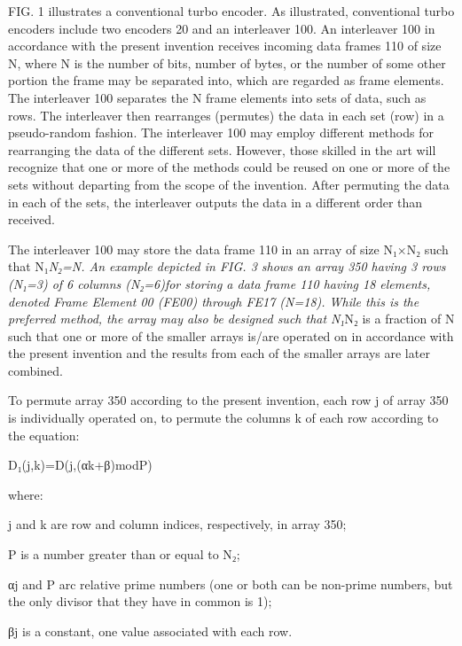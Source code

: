 \documentclass[11pt,a4paper]{article}
\begin{document}
FIG. 1 illustrates a conventional turbo encoder. As illustrated, conventional turbo encoders include two encoders 20 and an interleaver 100. An interleaver 100 in accordance with the present invention receives incoming data frames 110 of size N, where N is the number of bits, number of bytes, or the number of some other portion the frame may be separated into, which are regarded as frame elements. The interleaver 100 separates the N frame elements into sets of data, such as rows. The interleaver then rearranges (permutes) the data in each set (row) in a pseudo-random fashion. The interleaver 100 may employ different methods for rearranging the data of the different sets. However, those skilled in the art will recognize that one or more of the methods could be reused on one or more of the sets without departing from the scope of the invention. After permuting the data in each of the sets, the interleaver outputs the data in a different order than received.

The interleaver 100 may store the data frame 110 in an array of size N₁×N₂ such that N₁\textit{N₂=N. An example depicted in FIG. 3 shows an array 350 having 3 rows (N₁=3) of 6 columns (N₂=6)for storing a data frame 110 having 18 elements, denoted Frame Element 00 (FE00) through FE17 (N=18). While this is the preferred method, the array may also be designed such that N₁}N₂ is a fraction of N such that one or more of the smaller arrays is/are operated on in accordance with the present invention and the results from each of the smaller arrays are later combined.

To permute array 350 according to the present invention, each row j of array 350 is individually operated on, to permute the columns k of each row according to the equation:

D₁(j,k)=D(j,(αk+β)modP)

where:

j and k are row and column indices, respectively, in array 350;

P is a number greater than or equal to N₂;

αj and P arc relative prime numbers (one or both can be non-prime numbers, but the only divisor that they have in common is 1);

βj is a constant, one value associated with each row.
\end{document}
